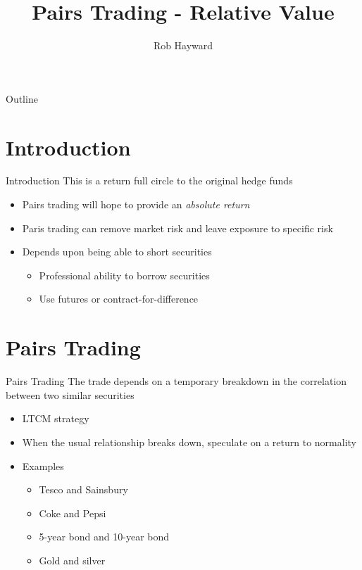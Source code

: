 \documentclass[14pt,xcolor=pdftex,dvipsnames,table]{beamer}\usepackage{graphicx, color}
\title{Pairs Trading - Relative Value}
\author{Rob Hayward}
\begin{document}
\begin{frame}
\titlepage
\end{frame}

\begin{frame}{Outline}
\tableofcontents
\end{frame}

\section{Introduction}
\begin{frame}{Introduction}
This is a return full circle to the original hedge funds
\begin{itemize}[<+-| alert@+>]
\item Pairs trading will hope to provide an \emph{absolute return}
\item Paris trading can remove market risk and leave exposure to specific risk
\item Depends upon being able to short securities
\begin{itemize}
\item Professional ability to borrow securities
\item Use futures or contract-for-difference
\end{itemize}
\end{itemize}
\end{frame}

\section{Pairs Trading}
\begin{frame}{Pairs Trading}
The trade depends on a temporary breakdown in the correlation between two similar securities
\begin{itemize}[<+-| alert@+>]
\item LTCM strategy
\item When the usual relationship breaks down, speculate on a return to normality
\item Examples
\begin{itemize}
\item Tesco and Sainsbury
\item Coke and Pepsi
\item 5-year bond and 10-year bond
\item Gold and silver
\end{itemize}
\end{itemize}
\end{frame}
\end{document}
